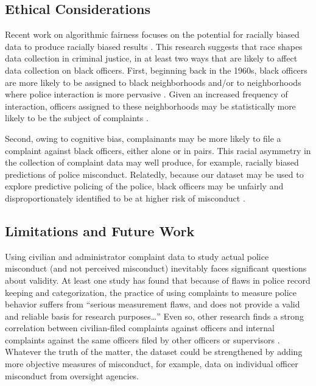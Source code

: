 \subsection{Ethical Considerations}

Recent work on algorithmic fairness focuses on the potential for racially
biased data to produce racially biased results \cite{veale2018fairness,sloane2019ai,d2020fairness}. 
This research suggests that race shapes data collection in criminal justice, in at least two ways that are
likely to affect data collection on black officers. First, beginning back in
the 1960s, black officers are more likely to be assigned to black neighborhoods
and/or to neighborhoods where police interaction is more pervasive \cite{Kuykendall80}. Given an
increased frequency of interaction, officers assigned to these neighborhoods
may be statistically more likely to be the subject of complaints \cite{Kane06}. 

Second, owing to cognitive bias, complainants may be more likely to file a
complaint against black officers, either alone or in pairs. This racial
asymmetry in the collection of complaint data may well produce, for example,
racially biased predictions of police misconduct. Relatedly, because our
dataset may be used to explore predictive policing of the police, black
officers may be unfairly and disproportionately identified to be at higher risk
of misconduct \cite{veale2018fairness,sloane2019ai,d2020fairness,Wood19}. 

\subsection{Limitations and Future Work}

Using civilian and administrator complaint data to study actual police
misconduct (and not perceived misconduct) inevitably faces significant
questions about validity. At least one study has found that because of flaws in
police record keeping and categorization, the practice of using complaints to
measure police behavior suffers from “serious measurement flaws, and does not
provide a valid and reliable basis for research purposes…” \cite{Hickman16} Even so, other
research finds a strong correlation between civilian-filed complaints against
officers and internal complaints against the same officers filed by other
officers or supervisors \cite{Lersch00}. Whatever the truth of the matter, the dataset could be
strengthened by adding more objective measures of misconduct, for example, data
on individual officer misconduct from oversight agencies.

